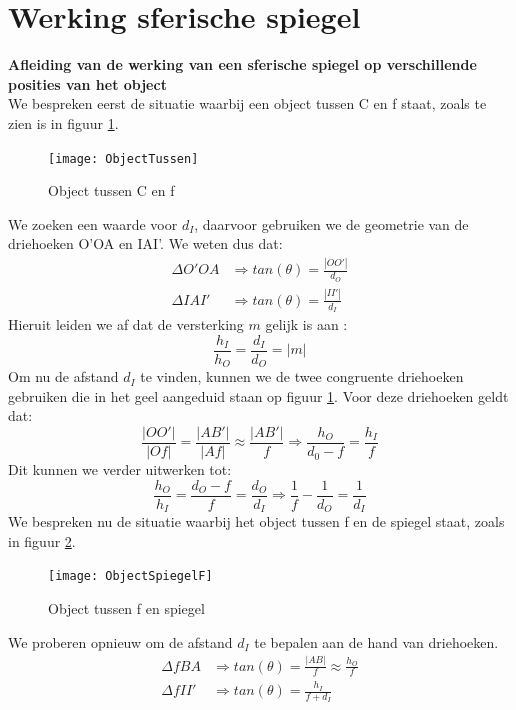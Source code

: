 \documentclass[a4paper,kul]{kulakarticle} %
\begin{document}
\section{Werking sferische spiegel}
\textbf{Afleiding van de werking van een sferische spiegel op verschillende posities van het object}\\
We bespreken eerst de situatie waarbij een object tussen C en f staat, zoals te zien is in figuur \ref{fig:objecttussen}.
\begin{figure}[h]
	\centering
	\texttt{[image: ObjectTussen]}
	\caption[Object tussen C en f]{Object tussen C en f}
	\label{fig:objecttussen}
\end{figure}
We zoeken een waarde voor $d_I$, daarvoor gebruiken we de geometrie van de driehoeken O'OA en IAI'.  We weten dus dat: 
\begin{align*}
	\Delta O'OA&\Rightarrow tan(\theta) = \frac{|OO'|}{d_O}\\
	\Delta IAI'&\Rightarrow tan(\theta) = \frac{|II'|}{d_I}
\end{align*}
Hieruit leiden we af dat de versterking $m$ gelijk is aan :
\begin{equation*}
	\frac{h_I}{h_O} = \frac{d_I}{d_O} = |m|
\end{equation*}
Om nu de afstand $d_I$ te vinden, kunnen we de twee congruente driehoeken gebruiken die in het geel aangeduid staan op figuur \ref{fig:objecttussen}. Voor deze driehoeken geldt dat: 
\begin{equation*}
	\frac{|OO'|}{|Of|}=\frac{|AB'|}{|Af|} \approx\frac{|AB'|}{f} \Rightarrow \frac{h_O}{d_0-f} = \frac{h_I}{f}
\end{equation*}
Dit kunnen we verder uitwerken tot:
\begin{equation*}
	\frac{h_O}{h_I} = \frac{d_O-f}{f}=\frac{d_O}{d_I}\Rightarrow\frac{1}{f}-\frac{1}{d_O} = \frac{1}{d_I}
\end{equation*}
\newpage
We bespreken nu de situatie waarbij het object tussen f en de spiegel staat, zoals in figuur \ref{fig:objectspiegelf}.
\begin{figure}[h]
	\centering
	\texttt{[image: ObjectSpiegelF]}
	\caption[Object tussen f en spiegel]{Object tussen f en spiegel}
	\label{fig:objectspiegelf}
\end{figure}
We proberen opnieuw om de afstand $d_I$ te bepalen aan de hand van driehoeken.
\begin{align*}
	\Delta fBA&\Rightarrow tan(\theta)=\frac{|AB|}{f}\approx\frac{h_O}{f}\\
	\Delta fII'&\Rightarrow tan(\theta)= \frac{h_I}{f+d_I}
\end{align*}
\end{document}
